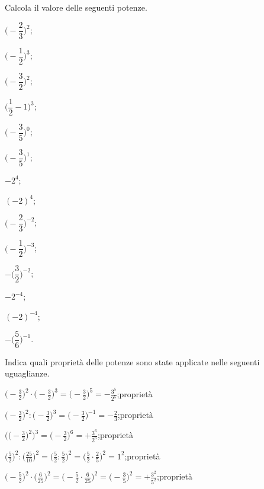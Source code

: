 \begin{esercizio}
 \label{ese:3.61}
Calcola il valore delle seguenti potenze.
\begin{multicols}{4}
\begin{enumeratea}
\spazielenx
 \item $\bigg(-\dfrac{2}{3}\bigg)^2$;
 \item $\bigg(-\dfrac{1}{2}\bigg)^3$;
 \item $\bigg(-\dfrac{3}{2}\bigg)^2$;
 \item $\bigg(\dfrac{1}{2}-1\bigg)^3$;
 \item $\bigg(-\dfrac{3}{5}\bigg)^0$;
 \item $\bigg(-\dfrac{3}{5}\bigg)^1$;
 \item $-2^4$;
 \item $(-2)^4$;
 \item $\bigg(-\dfrac{2}{3}\bigg)^{-2}$;
 \item $\bigg(-\dfrac{1}{2}\bigg)^{-3}$;
 \item $-\bigg(\dfrac{3}{2}\bigg)^{-2}$;
 \item $-2^{-4}$;
 \item $(-2)^{-4}$;
 \item $-\bigg(\dfrac{5}{6}\bigg)^{-1}$.
\end{enumeratea}
\end{multicols}
\end{esercizio}

\begin{esercizio}
 \label{ese:3.62}
Indica quali proprietà delle potenze sono state applicate nelle seguenti uguaglianze.
\begin{enumeratea}
\spazielenx
 \item $\displaystyle{\bigg(-\frac{3}{2}\bigg)^2\cdot\bigg(-\frac{3}{2}\bigg)^{3}=%
\bigg(-\frac{3}{2}\bigg)^{5}=-\frac{3^5}{2^5}}$;\quad proprietà \dotfill
 \item $\displaystyle{\bigg(-\frac{3}{2}\bigg)^2:\bigg(-\frac{3}{2}\bigg)^{3}=\bigg(-\frac{3}{2}\bigg)^{-1}=%
-\frac{2}{3}}$;\quad proprietà \dotfill
 \item $\displaystyle{\Bigg(\bigg(-\frac{3}{2}\bigg)^2\Bigg)^3=\bigg(-\frac{3}{2}\bigg)^{6}=%
+\frac{3^6}{2^6}}$;\quad proprietà \dotfill
 \item $\displaystyle{\bigg(\frac{5}{2}\bigg)^2:\bigg(\frac{25}{10}\bigg)^2=\bigg(\frac{5}{2}:\frac{5}{2}\bigg)^2=%
\bigg(\frac{5}{2}\cdot\frac{2}{5}\bigg)^2=1^2}$;\quad proprietà \dotfill
 \item $\displaystyle{\bigg(-\frac{5}{2}\bigg)^{2}\cdot\bigg(\frac{6}{25}\bigg)^{2}=\bigg(-\frac{5}{2}\cdot%
\frac{6}{25}\bigg)^{2}=\bigg(-\frac{3}{5}\bigg)^2=+\frac{3^2}{5^2}}$;\quad proprietà \dotfill
\end{enumeratea}
\end{esercizio}

